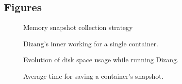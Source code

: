 \documentclass[twocolumn, notitlepage]{bmcart}%
\newcommand{\fancyname}{Dizang}
\begin{document}
\begin{backmatter}




\section*{Figures}

    \begin{figure}[h!]
    \caption{  Memory snapshot collection strategy }
    \label{fig:janela}
    \end{figure}
      
    \begin{figure}[h!]
    \caption{ \fancyname's inner working for a single container. }
    \label{fig:Solucao}
    \end{figure}
	  
    \begin{figure}[h!]
    \caption{ Evolution of disk space usage while running \fancyname.  }
    \label{fig:evolucao_coleta}
    \end{figure}
	  
    \begin{figure}[h!]
    \caption{ Average time for saving a container's snapshot. }
    \label{fig:memoria_copia}
    \end{figure}
	  

\end{backmatter}
\end{document}
